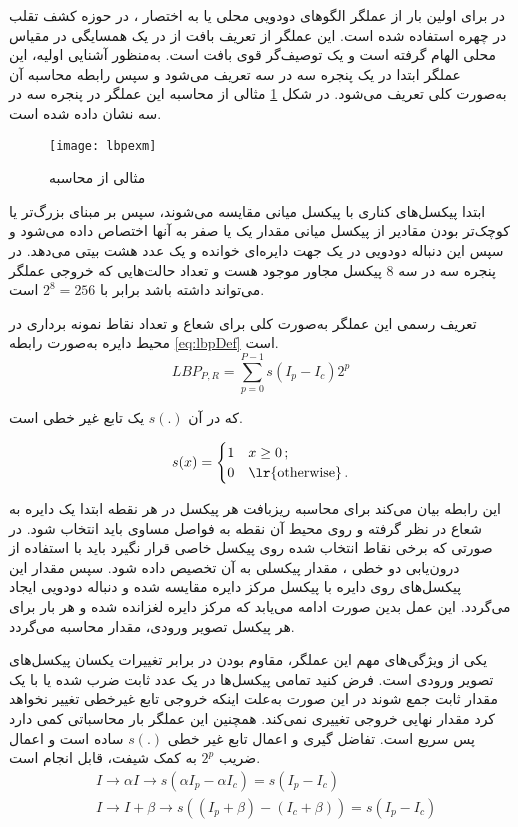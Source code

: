 در 
\cite{maatta2011face}
برای اولین بار از عملگر الگوهای دودویی محلی یا به اختصار ، در حوزه کشف تقلب در چهره استفاده شده است. این عملگر از تعریف بافت از در یک همسایگی در مقیاس محلی الهام گرفته است و یک توصیف‌گر قوی بافت است. به‌منظور آشنایی اولیه، این عملگر ابتدا در یک پنجره سه در سه تعریف می‌شود و سپس رابطه محاسبه آن به‌صورت کلی تعریف می‌شود. در شکل 
\ref{fig:lbpexm}
مثالی از محاسبه این عملگر در پنجره سه در سه نشان داده شده است.

\begin{figure}[ht]
	\centerline{\texttt{[image: lbpexm]}}
	\caption{مثالی از محاسبه  \cite{maatta2011face}}
	\label{fig:lbpexm}
\end{figure}
ابتدا پیکسل‌های کناری با پیکسل میانی مقایسه می‌شوند، سپس بر مبنای بزرگ‌تر یا کوچک‌تر بودن مقادیر از پیکسل میانی مقدار یک یا صفر به آنها اختصاص داده می‌شود و سپس این دنباله دودویی در یک جهت دایره‌ای خوانده و یک عدد هشت بیتی می‌دهد. در پنجره سه در سه 8 پیکسل مجاور موجود هست و تعداد حالت‌هایی که خروجی عملگر می‌تواند داشته باشد برابر با
$2^8=256$
است.





تعریف رسمی این عملگر به‌صورت کلی برای شعاع  و تعداد نقاط نمونه برداری  در محیط دایره به‌صورت رابطه
\ref{eq:lbpDef}
است.
\begin{equation}\label{eq:lbpDef}
			LBP_{P,R}=\sum_{p=0}^{P-1}s(I_p-I_c)2^p 
\end{equation}

که در آن
$s(.)$
یک تابع غیر خطی است.

\[ s(x) = 
\begin{cases} 1  & \text{$x \geq 0 $}\,; \\
	0  & \text{\lr{otherwise}}\,.
\end{cases} \]


این رابطه بیان می‌کند برای محاسبه ریزبافت هر پیکسل در هر نقطه ابتدا یک دایره به شعاع  در نظر گرفته و روی محیط آن  نقطه به فواصل مساوی باید انتخاب شود. در صورتی که برخی نقاط انتخاب شده روی پیکسل خاصی قرار نگیرد باید با استفاده از درون‌یابی دو خطی
، مقدار پیکسلی به آن تخصیص داده شود. سپس مقدار این پیکسل‌های روی دایره با پیکسل مرکز دایره مقایسه شده و دنباله دودویی ایجاد می‌گردد. این عمل بدین صورت ادامه می‌یابد که مرکز دایره لغزانده شده و هر بار برای هر پیکسل تصویر ورودی، مقدار  محاسبه می‌گردد.

یکی از ویژگی‌های مهم این عملگر، مقاوم بودن در برابر تغییرات یکسان پیکسل‌های تصویر ورودی است. فرض کنید تمامی پیکسل‌ها در یک عدد ثابت ضرب شده یا با یک مقدار ثابت جمع شوند در این صورت به‌علت اینکه خروجی تابع غیرخطی تغییر نخواهد کرد مقدار نهایی خروجی  تغییری نمی‌کند.
همچنین این عملگر بار محاسباتی کمی دارد پس سریع است. تفاضل گیری و اعمال تابع غیر خطی   
$s(.)$
ساده است و اعمال ضریب
$2^p$
به کمک شیفت، قابل انجام است.
\begin{align}\label{eq:lbpfeature}
	&I \to \alpha I \to s(\alpha I_p -\alpha I_c) = s(I_p - I_c) \\
	&I \to I+\beta \to s((I_p + \beta)-(I_c + \beta)) = s(I_p - I_c ) 
\end{align}

